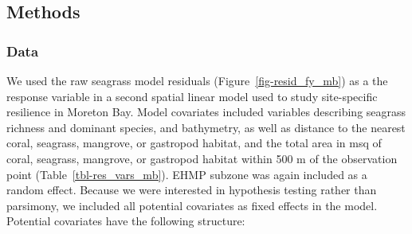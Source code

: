 \documentclass[
  letterpaper,
  DIV=11,
  numbers=noendperiod]{scrartcl}
\begin{document}
\subsection{Methods}\label{methods-1}

\subsubsection{Data}\label{data-1}

We used the raw seagrass model residuals (Figure~\ref{fig-resid_fy_mb})
as a the response variable in a second spatial linear model used to
study site-specific resilience in Moreton Bay. Model covariates included
variables describing seagrass richness and dominant species, and
bathymetry, as well as distance to the nearest coral, seagrass,
mangrove, or gastropod habitat, and the total area in msq of coral,
seagrass, mangrove, or gastropod habitat within 500 m of the observation
point (Table~\ref{tbl-res_vars_mb}). EHMP subzone was again included as
a random effect. Because we were interested in hypothesis testing rather
than parsimony, we included all potential covariates as fixed effects in
the model. Potential covariates have the following structure:
\end{document}
